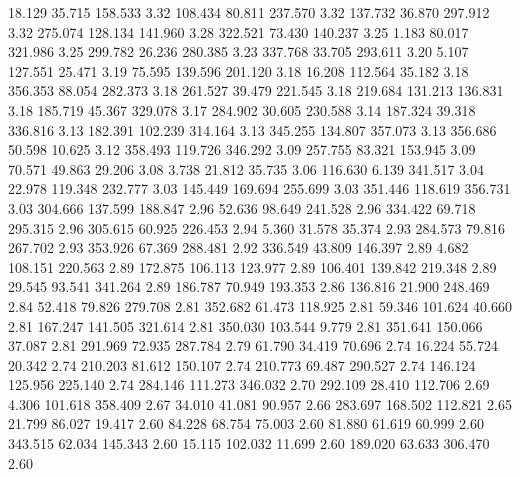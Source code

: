   18.129   35.715  158.533         3.32
 108.434   80.811  237.570         3.32
 137.732   36.870  297.912         3.32
 275.074  128.134  141.960         3.28
 322.521   73.430  140.237         3.25
   1.183   80.017  321.986         3.25
 299.782   26.236  280.385         3.23
 337.768   33.705  293.611         3.20
   5.107  127.551   25.471         3.19
  75.595  139.596  201.120         3.18
  16.208  112.564   35.182         3.18
 356.353   88.054  282.373         3.18
 261.527   39.479  221.545         3.18
 219.684  131.213  136.831         3.18
 185.719   45.367  329.078         3.17
 284.902   30.605  230.588         3.14
 187.324   39.318  336.816         3.13
 182.391  102.239  314.164         3.13
 345.255  134.807  357.073         3.13
 356.686   50.598   10.625         3.12
 358.493  119.726  346.292         3.09
 257.755   83.321  153.945         3.09
  70.571   49.863   29.206         3.08
   3.738   21.812   35.735         3.06
 116.630    6.139  341.517         3.04
  22.978  119.348  232.777         3.03
 145.449  169.694  255.699         3.03
 351.446  118.619  356.731         3.03
 304.666  137.599  188.847         2.96
  52.636   98.649  241.528         2.96
 334.422   69.718  295.315         2.96
 305.615   60.925  226.453         2.94
   5.360   31.578   35.374         2.93
 284.573   79.816  267.702         2.93
 353.926   67.369  288.481         2.92
 336.549   43.809  146.397         2.89
   4.682  108.151  220.563         2.89
 172.875  106.113  123.977         2.89
 106.401  139.842  219.348         2.89
  29.545   93.541  341.264         2.89
 186.787   70.949  193.353         2.86
 136.816   21.900  248.469         2.84
  52.418   79.826  279.708         2.81
 352.682   61.473  118.925         2.81
  59.346  101.624   40.660         2.81
 167.247  141.505  321.614         2.81
 350.030  103.544    9.779         2.81
 351.641  150.066   37.087         2.81
 291.969   72.935  287.784         2.79
  61.790   34.419   70.696         2.74
  16.224   55.724   20.342         2.74
 210.203   81.612  150.107         2.74
 210.773   69.487  290.527         2.74
 146.124  125.956  225.140         2.74
 284.146  111.273  346.032         2.70
 292.109   28.410  112.706         2.69
   4.306  101.618  358.409         2.67
  34.010   41.081   90.957         2.66
 283.697  168.502  112.821         2.65
  21.799   86.027   19.417         2.60
  84.228   68.754   75.003         2.60
  81.880   61.619   60.999         2.60
 343.515   62.034  145.343         2.60
  15.115  102.032   11.699         2.60
 189.020   63.633  306.470         2.60
